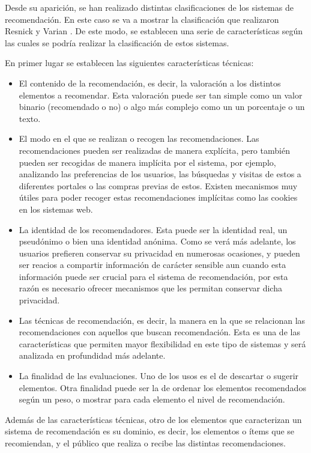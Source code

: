 Desde su aparición, se han realizado distintas clasificaciones de los sistemas de recomendación. En este caso se va a mostrar la clasificación que realizaron Resnick y Varian \cite{Resnick:1997:RS:245108.245121}. De este modo, se establecen una serie de características según las cuales se podría realizar la clasificación de estos sistemas. 

En primer lugar se establecen las siguientes características técnicas:

\begin{itemize}
\item El contenido de la recomendación, es decir, la valoración a los distintos elementos a recomendar. Esta valoración puede ser tan simple como un valor binario (recomendado o no) o algo más complejo como un un porcentaje o un texto.
\item El modo en el que se realizan o recogen las recomendaciones. Las recomendaciones pueden ser realizadas de manera explícita, pero también pueden ser recogidas de manera implícita por el sistema, por ejemplo, analizando las preferencias de los usuarios, las búsquedas y visitas de estos a diferentes portales o las compras previas de estos. Existen mecanismos muy útiles para poder recoger estas recomendaciones implícitas como las cookies en los sistemas web.
\item La identidad de los recomendadores. Esta puede ser la identidad real, un pseudónimo o bien una identidad anónima. Como se verá más adelante, los usuarios prefieren conservar su privacidad en numerosas ocasiones, y pueden ser reacios a compartir información de carácter sensible aun cuando esta información puede ser crucial para el sistema de recomendación, por esta razón es necesario ofrecer mecanismos que les permitan conservar dicha privacidad.
\item Las técnicas de recomendación, es decir, la manera en la que se relacionan las recomendaciones con aquellos que buscan recomendación. Esta es una de las características que permiten mayor flexibilidad en este tipo de sistemas y será analizada en profundidad más adelante.
\item La finalidad de las evaluaciones. Uno de los usos es el de descartar o sugerir elementos. Otra finalidad puede ser la de ordenar los elementos recomendados según un peso, o mostrar para cada elemento el nivel de recomendación. 
\end{itemize}

Además de las características técnicas, otro de los elementos que caracterizan un sistema de recomendación es su dominio, es decir, los elementos o ítems que se recomiendan, y el público que realiza o recibe las distintas recomendaciones.

